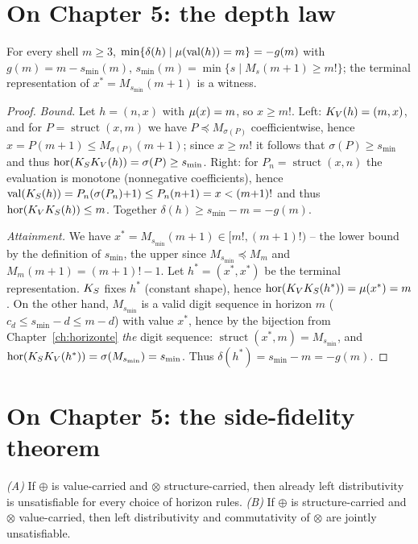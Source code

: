 \section*{On Chapter 5: the depth law}

\begin{satz}
For every shell $m\ge3$,
$\min\{\delta(h)\mid\mu(\operatorname{val}(h))=m\}=-g(m)$ with
$g(m)=m-s_{\min}(m)$,
$s_{\min}(m)=\min\{s\mid M_s(m{+}1)\ge m!\}$; the terminal
representation of $x^*=M_{s_{\min}}(m{+}1)$ is a witness.
\end{satz}

\begin{proof}
\emph{Bound.} Let $h=(n,x)$ with $\mu(x)=m$, so $x\ge m!$.
Left: $K_V(h)=(m,x)$, and for $P=\operatorname{struct}(x,m)$ we
have $P\preceq M_{\sigma(P)}$ coefficientwise, hence
$x=P(m{+}1)\le M_{\sigma(P)}(m{+}1)$; since $x\ge m!$ it follows
that $\sigma(P)\ge s_{\min}$ and thus
$\operatorname{hor}(K_SK_V(h))=\sigma(P)\ge s_{\min}$. Right: for
$P_n=\operatorname{struct}(x,n)$ the evaluation is monotone
(nonnegative coefficients), hence
$\operatorname{val}(K_S(h))=P_n(\sigma(P_n){+}1)\le P_n(n{+}1)=x<(m{+}1)!$ and
thus $\operatorname{hor}(K_VK_S(h))\le m$. Together
$\delta(h)\ge s_{\min}-m=-g(m)$.

\emph{Attainment.} We have
$x^*=M_{s_{\min}}(m{+}1)\in[m!,(m{+}1)!)$
-- the lower bound by the definition of $s_{\min}$, the upper
since $M_{s_{\min}}\preceq M_m$ and $M_m(m{+}1)=(m{+}1)!-1$. Let
$h^*=(x^*,x^*)$ be the terminal representation. $K_S$ fixes $h^*$
(constant shape), hence
$\operatorname{hor}(K_VK_S(h^*))=\mu(x^*)=m$. On the other hand, $M_{s_{\min}}$
is a valid digit sequence in horizon $m$
($c_d\le s_{\min}-d\le m-d$) with value $x^*$, hence by the
bijection from Chapter~\ref{ch:horizonte} \emph{the} digit
sequence: $\operatorname{struct}(x^*,m)=M_{s_{\min}}$, and
$\operatorname{hor}(K_SK_V(h^*))=\sigma(M_{s_{\min}})=s_{\min}$. Thus
$\delta(h^*)=s_{\min}-m=-g(m)$.
\end{proof}

\section*{On Chapter 5: the side-fidelity theorem}

\begin{satz}
\emph{(A)} If $\oplus$ is value-carried and $\otimes$
structure-carried, then already left distributivity is
unsatisfiable for every choice of horizon rules. \emph{(B)} If
$\oplus$ is structure-carried and $\otimes$ value-carried, then
left distributivity and commutativity of $\otimes$ are jointly
unsatisfiable.
\end{satz}

